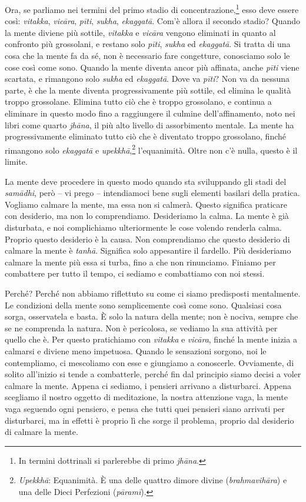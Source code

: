 Ora, se parliamo nei termini del primo stadio di
concentrazione,\footnote{In termini dottrinali si parlerebbe di primo
  \emph{jhāna}.} esso deve essere così: \emph{vitakka}, \emph{vicāra},
\emph{pīti}, \emph{sukha}, \emph{ekaggatā}. Com'è allora il secondo
stadio? Quando la mente diviene più sottile, \emph{vitakka} e
\emph{vicāra} vengono eliminati in quanto al confronto più grossolani, e
restano solo \emph{pīti}, \emph{sukha} ed \emph{ekaggatā}. Si tratta di
una cosa che la mente fa da sé, non è necessario fare congetture,
conosciamo solo le cose così come sono. Quando la mente diventa ancor
più affinata, anche \emph{pīti} viene scartata, e rimangono solo
\emph{sukha} ed \emph{ekaggatā}. Dove va \emph{pīti}? Non va da nessuna
parte, è che la mente diventa progressivamente più sottile, ed elimina
le qualità troppo grossolane. Elimina tutto ciò che è troppo grossolano,
e continua a eliminare in questo modo fino a raggiungere il culmine
dell'affinamento, noto nei libri come quarto \emph{jhāna}, il più alto
livello di assorbimento mentale. La mente ha progressivamente eliminato
tutto ciò che è diventato troppo grossolano, finché rimangono solo
\emph{ekaggatā} e \emph{upekkhā},\footnote{\emph{Upekkhā}: Equanimità. È
  una delle quattro dimore divine (\emph{brahmavihāra}) e una delle
  Dieci Perfezioni (\emph{pāramī}).} l'equanimità. Oltre non c'è nulla,
questo è il limite.

La mente deve procedere in questo modo quando sta sviluppando gli stadi
del \emph{samādhi}, però -- vi prego -- intendiamoci bene sugli elementi
basilari della pratica. Vogliamo calmare la mente, ma essa non si
calmerà. Questo significa praticare con desiderio, ma non lo
comprendiamo. Desideriamo la calma. La mente è già disturbata, e noi
complichiamo ulteriormente le cose volendo renderla calma. Proprio
questo desiderio è la causa. Non comprendiamo che questo desiderio di
calmare la mente è \emph{tanhā}. Significa solo appesantire il fardello.
Più desideriamo calmare la mente più essa si turba, fino a che non
rinunciamo. Finiamo per combattere per tutto il tempo, ci sediamo e
combattiamo con noi stessi.

Perché? Perché non abbiamo riflettuto su come ci siamo predisposti
mentalmente. Le condizioni della mente sono semplicemente così come
sono. Qualsiasi cosa sorga, osservatela e basta. È solo la natura della
mente; non è nociva, sempre che se ne comprenda la natura. Non è
pericolosa, se vediamo la sua attività per quello che è. Per questo
pratichiamo con \emph{vitakka} e \emph{vicāra}, finché la mente inizia a
calmarsi e diviene meno impetuosa. Quando le sensazioni sorgono, noi le
contempliamo, ci mescoliamo con esse e giungiamo a conoscerle.
Ovviamente, di solito all'inizio si tende a combatterle, perché fin dal
principio siamo decisi a voler calmare la mente. Appena ci sediamo, i
pensieri arrivano a disturbarci. Appena scegliamo il nostro oggetto di
meditazione, la nostra attenzione vaga, la mente vaga seguendo ogni
pensiero, e pensa che tutti quei pensieri siano arrivati per
disturbarci, ma in effetti è proprio lì che sorge il problema, proprio
dal desiderio di calmare la mente.

